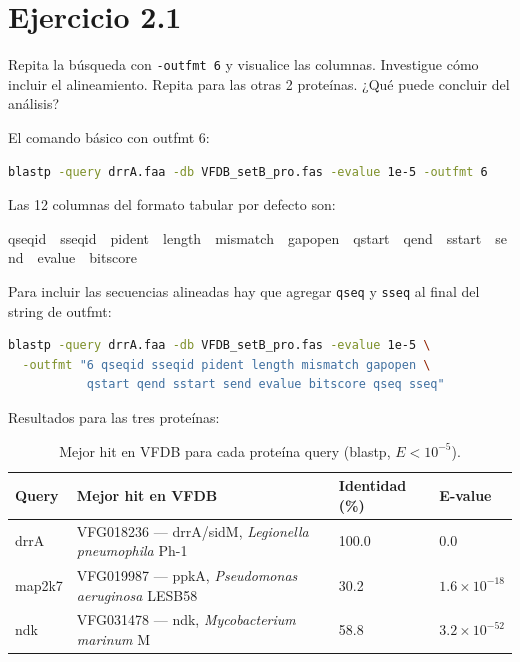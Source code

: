 \section{Ejercicio 2.1}

\begin{consigna}
Repita la búsqueda con \texttt{-outfmt 6} y visualice las columnas. Investigue cómo incluir el
alineamiento. Repita para las otras 2 proteínas. ¿Qué puede concluir del análisis?
\end{consigna}

El comando básico con outfmt 6:

\begin{lstlisting}[language=bash]
blastp -query drrA.faa -db VFDB_setB_pro.fas -evalue 1e-5 -outfmt 6
\end{lstlisting}

Las 12 columnas del formato tabular por defecto son:

\begin{center}
\small\ttfamily
qseqid\ \ sseqid\ \ pident\ \ length\ \ mismatch\ \ gapopen\ \ qstart\ \ qend\ \ sstart\ \ send\ \ evalue\ \ bitscore
\end{center}

Para incluir las secuencias alineadas hay que agregar \texttt{qseq} y \texttt{sseq} al final del string de
outfmt:

\begin{lstlisting}[language=bash]
blastp -query drrA.faa -db VFDB_setB_pro.fas -evalue 1e-5 \
  -outfmt "6 qseqid sseqid pident length mismatch gapopen \
           qstart qend sstart send evalue bitscore qseq sseq"
\end{lstlisting}

Resultados para las tres proteínas:

\begin{table}[H]
\centering
\footnotesize
\begin{tabular}{llP{1.8cm}P{2.2cm}}
\toprule
Query & Mejor hit en VFDB & Identidad (\%) & E-value \\
\midrule
drrA   & VFG018236 --- drrA/sidM, \textit{Legionella pneumophila} Ph-1  & 100.0 & 0.0 \\
map2k7 & VFG019987 --- ppkA, \textit{Pseudomonas aeruginosa} LESB58     & 30.2  & $1.6 \times 10^{-18}$ \\
ndk    & VFG031478 --- ndk, \textit{Mycobacterium marinum} M             & 58.8  & $3.2 \times 10^{-52}$ \\
\bottomrule
\end{tabular}
\caption{Mejor hit en VFDB para cada proteína query (blastp, $E < 10^{-5}$).}
\end{table}

